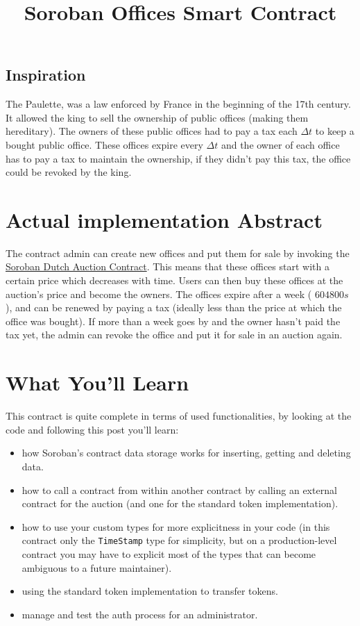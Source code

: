 \documentclass[10pt]{article}
\title{Soroban Offices Smart Contract}
\author{}
\date{}
\begin{document}
\maketitle

\subsection*{Inspiration}
The Paulette, was a law enforced by France in the beginning of the 17th century. It allowed the king to sell the ownership of public offices (making them hereditary). The owners of these public offices had to pay a tax each $\Delta t$ to keep a bought public office. These offices expire every $\Delta t$ and the owner of each office has to pay a tax to maintain the ownership, if they didn't pay this tax, the office could be revoked by the king.

\section*{Actual implementation Abstract}
The contract admin can create new offices and put them for sale by invoking the \href{https://github.com/Xycloo/soroban-dutch-auction-contract}{Soroban Dutch Auction Contract}. This means that these offices start with a certain price which decreases with time. Users can then buy these offices at the auction's price and become the owners. The offices expire after a week ( $604800s$ ), and can be renewed by paying a tax (ideally less than the price at which the office was bought). If more than a week goes by and the owner hasn't paid the tax yet, the admin can revoke the office and put it for sale in an auction again.

\section*{What You'll Learn}
This contract is quite complete in terms of used functionalities, by looking at the code and following this post you'll learn:

\begin{itemize}
  \item how Soroban's contract data storage works for inserting, getting and deleting data.
  \item how to call a contract from within another contract by calling an external contract for the auction (and one for the standard token implementation).
  \item how to use your custom types for more explicitness in your code (in this contract only the \texttt{TimeStamp} type for simplicity, but on a production-level contract you may have to explicit most of the types that can become ambiguous to a future maintainer).
  \item using the standard token implementation to transfer tokens.
  \item manage and test the auth process for an administrator.
\end{itemize}
\end{document}

